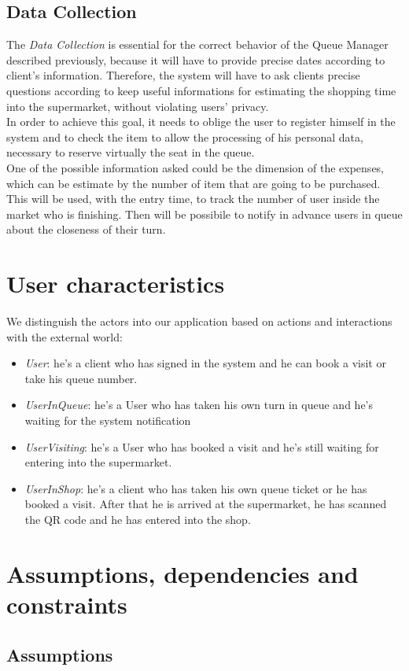 \subsection{Data Collection}
The \textit{Data Collection} is essential for the correct behavior of the Queue Manager described previously, because it will have to provide precise dates according to client’s information. 
Therefore, the system will have to ask clients precise questions according to keep useful informations for estimating the shopping time into the supermarket, without violating users’ privacy. 
\\
In order to achieve this goal, it needs to oblige the user to register himself in the system and to check the item to allow the processing of his personal data, necessary to reserve virtually the seat in the queue.
\\
One of the possible information asked could be the dimension of the expenses, which can be estimate by the number of item that are going to be purchased. This will be used, with the entry time, to track the number of user inside the market who is finishing. Then will be possibile to notify in advance users in queue about the closeness of their turn.

\section{User characteristics}
We distinguish the actors into our application based on actions and interactions with the external world:

\begin{itemize}
\item \textit{User}: he’s a client who has signed in the system and he can book a visit or take his queue number.
\item \textit{UserInQueue}: he’s a User who has taken his own turn in queue and he’s waiting for the system notification
\item \textit{UserVisiting}: he’s a User who has booked a visit and he’s still waiting for entering into the supermarket.
\item \textit{UserInShop}: he’s a client who has taken his own queue ticket or he has booked a visit. After that he is arrived at the supermarket, he has scanned the QR code and he has entered into the shop.
\end{itemize}


\section{Assumptions, dependencies and constraints}
\subsection{Assumptions}
